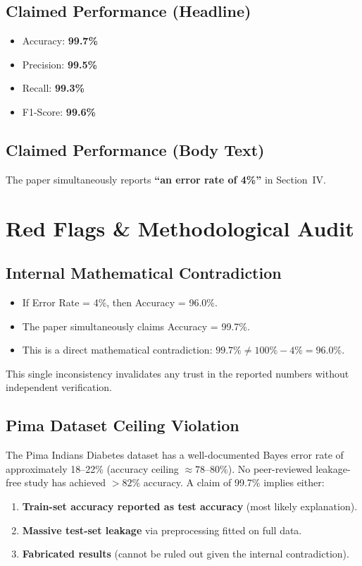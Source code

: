 \documentclass[12pt,a4paper]{article}
\begin{document}
\subsection{Claimed Performance (Headline)}
\begin{itemize}[leftmargin=*]
  \item Accuracy: \textbf{99.7\%}
  \item Precision: \textbf{99.5\%}
  \item Recall: \textbf{99.3\%}
  \item F1-Score: \textbf{99.6\%}
\end{itemize}

\subsection{Claimed Performance (Body Text)}
The paper simultaneously reports \textbf{``an error rate of 4\%''} in Section~IV.

\section{Red Flags \& Methodological Audit}
\subsection{Internal Mathematical Contradiction}
\begin{itemize}[leftmargin=*]
  \item If Error Rate = 4\%, then Accuracy = 96.0\%.
  \item The paper simultaneously claims Accuracy = 99.7\%.
  \item This is a direct mathematical contradiction: $99.7\% \neq 100\% - 4\% = 96.0\%$.
\end{itemize}
This single inconsistency invalidates any trust in the reported numbers without independent verification.

\subsection{Pima Dataset Ceiling Violation}
The Pima Indians Diabetes dataset has a well-documented Bayes error rate of approximately 18--22\% (accuracy ceiling $\approx 78$--80\%). No peer-reviewed leakage-free study has achieved $>82\%$ accuracy. A claim of 99.7\% implies either:
\begin{enumerate}[leftmargin=*]
  \item \textbf{Train-set accuracy reported as test accuracy} (most likely explanation).
  \item \textbf{Massive test-set leakage} via preprocessing fitted on full data.
  \item \textbf{Fabricated results} (cannot be ruled out given the internal contradiction).
\end{enumerate}
\end{document}
